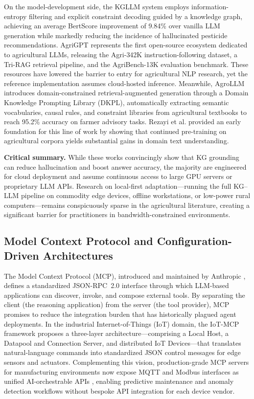 On the model-development side, the KGLLM system \cite{kgllm2024} employs information-entropy filtering and explicit constraint decoding guided by a knowledge graph, achieving an average BertScore improvement of 9.84\% over vanilla LLM generation while markedly reducing the incidence of hallucinated pesticide recommendations. AgriGPT \cite{yang2025agrigpt} represents the first open-source ecosystem dedicated to agricultural LLMs, releasing the Agri-342K instruction-following dataset, a Tri-RAG retrieval pipeline, and the AgriBench-13K evaluation benchmark. These resources have lowered the barrier to entry for agricultural NLP research, yet the reference implementation assumes cloud-hosted inference. Meanwhile, AgroLLM \cite{samuel2025agrollm} introduces domain-constrained retrieval-augmented generation through a Domain Knowledge Prompting Library (DKPL), automatically extracting semantic vocabularies, causal rules, and constraint libraries from agricultural textbooks to reach 95.2\% accuracy on farmer advisory tasks. Rezayi et al. \cite{rezayi2022agribert} provided an early foundation for this line of work by showing that continued pre-training on agricultural corpora yields substantial gains in domain text understanding.

\textbf{Critical summary.} While these works convincingly show that KG grounding can reduce hallucination and boost answer accuracy, the majority are engineered for cloud deployment and assume continuous access to large GPU servers or proprietary LLM APIs. Research on local-first adaptation---running the full KG--LLM pipeline on commodity edge devices, offline workstations, or low-power rural computers---remains conspicuously sparse in the agricultural literature, creating a significant barrier for practitioners in bandwidth-constrained environments.

\subsection{Model Context Protocol and Configuration-Driven Architectures}

The Model Context Protocol (MCP), introduced and maintained by Anthropic \cite{anthropic2024mcp}, defines a standardized JSON-RPC~2.0 interface through which LLM-based applications can discover, invoke, and compose external tools. By separating the client (the reasoning application) from the server (the tool provider), MCP promises to reduce the integration burden that has historically plagued agent deployments. In the industrial Internet-of-Things (IoT) domain, the IoT-MCP framework \cite{iotmcp2025} proposes a three-layer architecture---comprising a Local Host, a Datapool and Connection Server, and distributed IoT Devices---that translates natural-language commands into standardized JSON control messages for edge sensors and actuators. Complementing this vision, production-grade MCP servers for manufacturing environments now expose MQTT and Modbus interfaces as unified AI-orchestrable APIs \cite{iotedgemcp2025}, enabling predictive maintenance and anomaly detection workflows without bespoke API integration for each device vendor.

